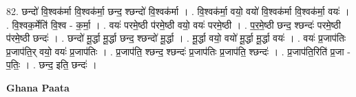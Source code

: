 \documentclass[17pt]{extarticle}
\begin{document}
82. छन्दो॑ वि॒श्वक॑र्मा वि॒श्वक॑र्मा॒ छन्द॒ श्छन्दो॑ वि॒श्वक॑र्मा । . वि॒श्वक॑र्मा॒ वयो॒ वयो॑ वि॒श्वक॑र्मा वि॒श्वक॑र्मा॒ वयः॑ । . वि॒श्वक॒र्मेति॑ वि॒श्व - क॒र्मा॒ । . वयः॑ परमे॒ष्ठी प॑रमे॒ष्ठी वयो॒ वयः॑ परमे॒ष्ठी । . प॒र॒मे॒ष्ठी छन्द॒ श्छन्दः॑ परमे॒ष्ठी प॑रमे॒ष्ठी छन्दः॑ । . छन्दो॑ मू॒र्द्धा मू॒र्द्धा छन्द॒ श्छन्दो॑ मू॒र्द्धा । . मू॒र्द्धा वयो॒ वयो॑ मू॒र्द्धा मू॒र्द्धा वयः॑ । . वयः॑ प्र॒जाप॑तिः प्र॒जाप॑ति॒र् वयो॒ वयः॑ प्र॒जाप॑तिः । . प्र॒जाप॑ति॒ श्छन्द॒ श्छन्दः॑ प्र॒जाप॑तिः प्र॒जाप॑ति॒ श्छन्दः॑ । . प्र॒जाप॑ति॒रिति॑ प्र॒जा - प॒तिः॒ । . छन्द॒ इति॒ छन्दः॑ । \newline

\textbf{Ghana Paata } \newline
\end{document}
